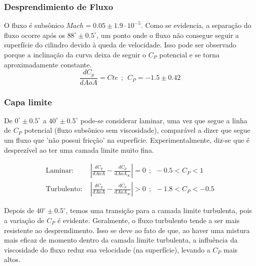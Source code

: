 \subsubsection{Desprendimiento de Fluxo}

 O fluxo é subsônico $ Mach = 0.05 \pm 1.9 \cdot 10^{-5} $. Como se evidencia, a separação do fluxo ocorre após os $88^\circ \pm 0.5^\circ$, um ponto onde o fluxo não consegue seguir a superfície do cilindro devido à queda de velocidade. Isso pode ser observado porque a inclinação da curva deixa de seguir o $C_P$ potencial e se torna aproximadamente constante.
\begin{equation}
   \frac{dC_{p}}{dAoA} = Cte ~~ ; ~~  C_P = -1.5 \pm 0.42
\end{equation}


\subsubsection{Capa limite}
De $0^\circ \pm 0.5^\circ$ a $40^\circ \pm 0.5^\circ$ pode-se considerar laminar, uma vez que segue a linha de $C_P$ potencial (fluxo subsônico sem viscosidade), comparável a dizer que segue um fluxo que 'não possui fricção' na superfície. Experimentalmente, diz-se que é desprezível ao ter uma camada limite muito fina.


\begin{equation}
\begin{aligned}
\text{Laminar: } & \left| \frac{dC_{p}}{dAoA} - \frac{d\bar{C}_{p}}{dAoA_\infty} \right| = 0~~ ; ~~  -0.5 < C_P < 1\\ 
\text{Turbulento: } & \left| \frac{dC_{p}}{dAoA} - \frac{d\bar{C}_{p}}{dAoA_\infty} \right| > 0 ~~; ~~  -1.8 < C_P < -0.5 
\end{aligned}
\end{equation}


Depois de $40^\circ \pm 0.5^\circ$, temos uma transição para a camada limite turbulenta, pois a variação de $C_P$ é evidente. Geralmente, o fluxo turbulento tende a ser mais resistente ao desprendimento. Isso se deve ao fato de que, ao haver uma mistura mais eficaz de momento dentro da camada limite turbulenta, a influência da viscosidade do fluxo reduz sua velocidade (na superfície), levando a $C_P$ mais altos.


